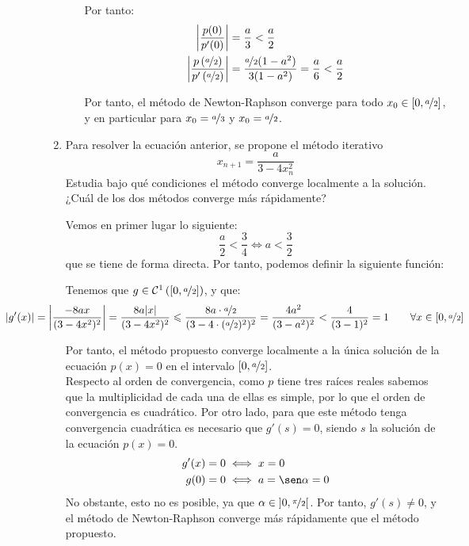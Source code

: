 \begin{ejercicio}[DGIIM 2023/2024]
\begin{enumerate}
\begin{enumerate}
            Por tanto:
            \begin{align*}
                \left|\dfrac{p(0)}{p'(0)}\right| &= \dfrac{a}{3}<\frac{a}{2}\\
                \left|\dfrac{p\left(\nicefrac{a}{2}\right)}{p'\left(\nicefrac{a}{2}\right)}\right| &= \dfrac{\nicefrac{a}{2}(1-a^2)}{3(1-a^2)} = \dfrac{a}{6}<\frac{a}{2}
            \end{align*}

            Por tanto, el método de Newton-Raphson converge para todo $x_0\in \left[0,\nicefrac{a}{2}\right]$, y en particular para $x_0 = \nicefrac{a}{3}$ y $x_0 = \nicefrac{a}{2}$.


        \end{enumerate}
        \item Para resolver la ecuación anterior, se propone el método iterativo
        \[
            x_{n+1} = \frac{a}{3- 4x_n^2}
        \]
        Estudia bajo qué condiciones el método converge localmente a la solución. ¿Cuál de los dos métodos converge más rápidamente?

        Vemos en primer lugar lo siguiente:
        \begin{equation*}
            \frac{a}{2}<\frac{3}{4}\iff a<\frac{3}{2}
        \end{equation*}
        que se tiene de forma directa. Por tanto, podemos definir la siguiente función:

        Tenemos que $g\in \mathcal{C}^1\left(\left[0,\nicefrac{a}{2}\right]\right)$, y que:
        \begin{equation*}
            \hspace{-2cm}|g'(x)| = \left|\dfrac{-8ax}{(3-4x^2)^2}\right|
            = \dfrac{8a|x|}{(3-4x^2)^2}\leq \dfrac{8a\cdot \nicefrac{a}{2}}{(3-4\cdot (\nicefrac{a}{2})^2)^2} = \dfrac{4a^2}{(3-a^2)^2}<\dfrac{4}{(3-1)^2}=1\qquad \forall x\in \left[0,\nicefrac{a}{2}\right]
        \end{equation*}

        Por tanto, el método propuesto converge localmente a la única solución de la ecuación $p(x) = 0$ en el intervalo $\left[0,\nicefrac{a}{2}\right]$.\\

        Respecto al orden de convergencia, como $p$ tiene tres raíces reales sabemos que la multiplicidad de cada una de ellas es simple, por lo que el orden de convergencia es cuadrático. Por otro lado, para que este método tenga convergencia cuadrática es necesario que $g'(s)=0$, siendo $s$ la solución de la ecuación $p(x)=0$.
        \begin{align*}
            g'(x)=0&\iff x=0\\
            g(0)= 0&\iff a=\sen\alpha=0
        \end{align*}
        No obstante, esto no es posible, ya que $\alpha\in \left]0,\nicefrac{\pi}{2}\right[$. Por tanto, $g'(s)\neq 0$, y el método de Newton-Raphson converge más rápidamente que el método propuesto.


\end{enumerate}
\end{ejercicio}

